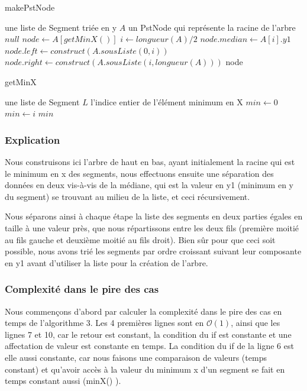 \documentclass[10pt,a4paper]{article}
\begin{document}
\begin{algorithm}
\caption{makePstNode}
\begin{algorithmic}[1]
\REQUIRE une liste de Segment triée en y $A$ 
\ENSURE un PstNode qui représente la racine de l'arbre
\RETURN $null$
\ENDIF
\STATE $node \leftarrow A[getMinX()] $
\STATE $i \leftarrow longueur(A)/2$
\STATE $node.median \leftarrow A[i].y1 $
\STATE $node.left \leftarrow construct(A.sousListe(0,i)) $
\STATE $node.right \leftarrow construct(A.sousListe(i,longueur(A))) $
\ENDIF
\RETURN node
\end{algorithmic}
\end{algorithm}

\newpage
\begin{algorithm}
\caption{getMinX}
\begin{algorithmic}[1]
\REQUIRE une liste de Segment $L$
\ENSURE l'indice entier de l’élément minimum en X
\ENDIF
\STATE $min \leftarrow 0$
\STATE $min \leftarrow i$
\ENDIF
\ENDFOR
\RETURN $min$
\end{algorithmic}
\end{algorithm}

\subsubsection{Explication}

Nous construisons ici l'arbre de haut en bas, ayant initialement la racine qui est le minimum en x des segments, nous effectuons ensuite une séparation des données en deux vis-à-vis de la médiane, qui est la valeur en y1 (minimum en y du segment) se trouvant au milieu de la liste, et ceci récursivement. 

Nous séparons ainsi à chaque étape la liste des segments en deux parties égales en taille à une valeur près, que nous répartissons entre les deux fils (première moitié au fils gauche et deuxième moitié au fils droit). Bien sûr pour que ceci soit possible, nous avons trié les segments par ordre croissant suivant leur composante en y1 avant d'utiliser la liste pour la création de l'arbre.

\subsubsection{Complexité dans le pire des cas}
Nous commençons d'abord par calculer la complexité dans le pire des cas en temps de l'algorithme 3.
Les 4 premières lignes sont en $\mathcal{O} (1)$, ainsi que les lignes 7 et 10, car le retour est constant, la condition du if est constante et une affectation de valeur est constante en temps. La condition du if de la ligne 6 est elle aussi constante, car nous faisons une comparaison de valeurs (temps constant) et qu'avoir accès à la valeur du minimum x d'un segment se fait en temps constant aussi (minX() ).
\end{document}
